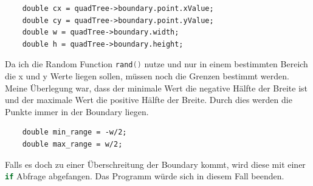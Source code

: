 \documentclass[11pt]{article}
\newcommand{\lstin}[1]{\lstinline[language=C]{#1}}
\begin{document}
\begin{lstlisting}
    double cx = quadTree->boundary.point.xValue; 
    double cy = quadTree->boundary.point.yValue; 
    double w = quadTree->boundary.width; 
    double h = quadTree->boundary.height;
\end{lstlisting}
Da ich die Random Function \lstin{rand()} nutze und nur in einem bestimmten Bereich die x und y Werte liegen sollen, müssen noch die Grenzen bestimmt werden. Meine Überlegung war, dass der minimale Wert die negative Hälfte der Breite ist und der maximale Wert die positive Hälfte der Breite.
Durch dies werden die Punkte immer in der Boundary liegen. 
\begin{lstlisting}
    double min_range = -w/2; 
    double max_range = w/2; 
\end{lstlisting}
Falls es doch zu einer Überschreitung der Boundary kommt, wird diese mit einer \lstin{if} Abfrage abgefangen. Das Programm würde sich in diesem Fall beenden. 
\end{document}
